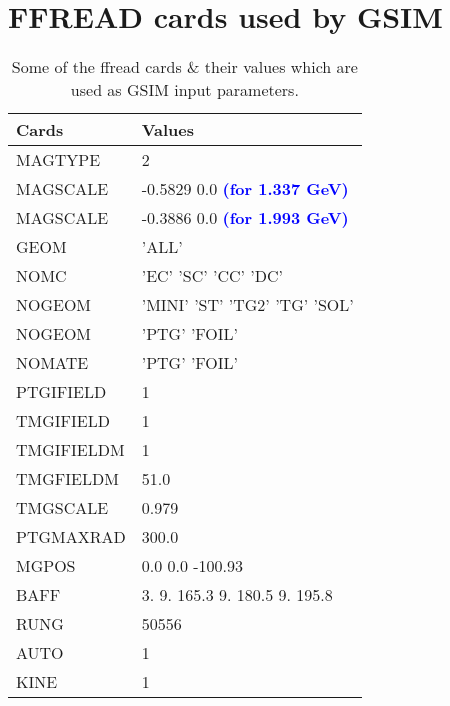 \chapter{FFREAD cards used by GSIM} %
\label{ffreadCards}

\begin{table}[H]%
\centering
\caption[FFread cards for GSIM]{Some of the ffread cards \& their values which are used as GSIM input parameters.}
\label{tab:ffread}
    \begin{tabular}{ | l | l |}
    \hline
    \textbf{Cards}      &     \textbf{Values}     \\ \hline
    MAGTYPE     &     2        \\  \hline
    MAGSCALE    &    -0.5829 0.0 \textbf{\textcolor{blue}{(for 1.337 GeV)}}   \\  \hline
    MAGSCALE    &    -0.3886 0.0 \textbf{\textcolor{blue}{(for 1.993 GeV)}}  \\  \hline
    GEOM        &    'ALL'      \\  \hline
    NOMC        &    'EC' 'SC' 'CC' 'DC'      \\  \hline
    NOGEOM      &    'MINI' 'ST'  'TG2' 'TG' 'SOL'      \\  \hline
    NOGEOM      &    'PTG' 'FOIL'      \\  \hline
    NOMATE      &    'PTG' 'FOIL'      \\  \hline
    PTGIFIELD   &     1      \\  \hline
    TMGIFIELD   &     1      \\  \hline
    TMGIFIELDM  &     1      \\  \hline
    TMGFIELDM   &     51.0      \\  \hline
    TMGSCALE    &     0.979       \\  \hline
    PTGMAXRAD   &     300.0      \\  \hline
    MGPOS       &    0.0 0.0 -100.93      \\  \hline
    BAFF        &    3. 9. 165.3 9. 180.5 9. 195.8      \\  \hline
    RUNG        &    50556      \\  \hline
    AUTO        &    1       \\  \hline
    KINE        &    1       \\  \hline
    \end{tabular}
\end{table}

